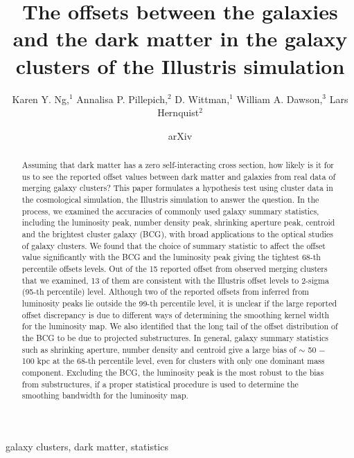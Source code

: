 \documentclass[usenatbib]{mn2e}
\title[
	The offsets between the galaxies and the dark matter in the galaxy clusters of the Illustris simulation]
{The offsets between the galaxies and the dark matter	in the galaxy clusters of
the Illustris simulation}
\author[Karen Y. Ng et al.]{Karen Y. Ng,$^{1}$
	Annalisa P. Pillepich,$^{2}$ 
	D. Wittman,$^{1}$
	William A. Dawson,$^{3}$ 
	\newauthor Lars Hernquist$^{2}$
}
\begin{document}
\date{arXiv} \pagerange{\pageref{firstpage}--\pageref{lastpage}}
 \maketitle\label{firstpage}
\begin{abstract} 
	Assuming that dark matter has a zero self-interacting cross section, how likely is
	it for us to see the reported offset values between dark matter and galaxies 
	from real data of merging galaxy clusters? 
	This paper formulates a hypothesis test using cluster data in the cosmological 
	simulation, the Illustris simulation to answer the question. 
	In the process,
	we examined the accuracies of commonly used galaxy summary 
	statistics, including the
	luminosity peak, number density peak, shrinking aperture peak, centroid and
	the brightest cluster galaxy (BCG), with broad applications to the optical studies of
	galaxy clusters. 	
	We found that the choice of summary statistic to affect the offset
	value significantly with the BCG and the luminosity peak giving the tightest
	68-th percentile offsets levels.  
	Out of the 15 reported offset from observed merging clusters
	that we examined, 13 of
	them are consistent with the Illustris offset levels to 2-sigma 
	(95-th percentile) level. Although two of the reported offsets from inferred
	from luminosity peaks lie outside the 99-th percentile level, it is unclear
	if the large reported offset discrepancy is due to different ways of
	determining the smoothing kernel width for the luminosity map. 
	We also identified that the long
	tail of the offset distribution of the BCG to be due to projected 
	substructures. In general, galaxy summary statistics such as
	shrinking aperture, number density and centroid give a large bias of $\sim$ 50
	$-$ 100 kpc at
	the 68-th percentile level, even for clusters with only one dominant 
	mass component. Excluding the BCG, 
	the luminosity peak is the most 
	robust to the bias from substructures, 
	if a proper statistical procedure is used to determine
	the smoothing bandwidth for the luminosity map.
\end{abstract}

\begin{keywords}
	galaxy clusters, dark matter, statistics 
\end{keywords}





\appendix


\clearpage\bsp\label{lastpage} 
\end{document}
